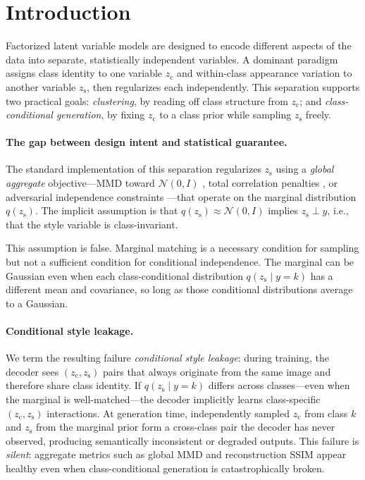 \documentclass[10pt]{article}
\newcommand{\zc}{z_{\mathrm{c}}}
\newcommand{\zs}{z_{\mathrm{s}}}
\begin{document}
\section{Introduction}

Factorized latent variable models are designed to encode different
aspects of the data into separate, statistically independent variables.
A dominant paradigm assigns class identity to one variable $\zc$ and
within-class appearance variation to another variable $\zs$, then regularizes
each independently.
This separation supports two practical goals: \emph{clustering}, by reading off
class structure from $\zc$; and \emph{class-conditional generation}, by fixing
$\zc$ to a class prior while sampling $\zs$ freely.

\paragraph{The gap between design intent and statistical guarantee.}
The standard implementation of this separation regularizes $\zs$ using a
\emph{global aggregate} objective---MMD toward $\mathcal{N}(0,I)$
\citep{tolstikhin2017wasserstein}, total correlation
penalties \citep{kim2018disentangling,chen2018isolating}, or adversarial
independence constraints \citep{chen2016infogan}---that operate on the marginal
distribution $q(\zs)$.
The implicit assumption is that $q(\zs)\approx\mathcal{N}(0,I)$ implies
$\zs\perp y$, i.e., that the style variable is class-invariant.

This assumption is false.
Marginal matching is a necessary condition for sampling but not a sufficient
condition for conditional independence.
The marginal can be Gaussian even when each class-conditional distribution
$q(\zs\mid y{=}k)$ has a different mean and covariance, so long as those
conditional distributions average to a Gaussian.

\paragraph{Conditional style leakage.}
We term the resulting failure \emph{conditional style leakage}: during training, the
decoder sees $(\zc, \zs)$ pairs that always originate from the same image and
therefore share class identity.
If $q(\zs\mid y{=}k)$ differs across classes---even when the marginal is
well-matched---the decoder implicitly learns class-specific $(\zc, \zs)$
interactions.
At generation time, independently sampled $\zc$ from class $k$ and $\zs$ from the
marginal prior form a cross-class pair the decoder has never observed, producing
semantically inconsistent or degraded outputs.
This failure is \emph{silent}: aggregate metrics such as global MMD and reconstruction
SSIM appear healthy even when class-conditional generation is catastrophically broken.
\end{document}
